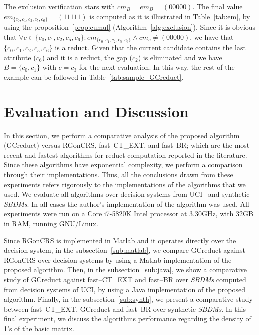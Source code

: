 \documentclass[number,preprint,review,12pt]{elsarticle}
\begin{document}
	The exclusion verification stars with $cm_B = em_B = (00000)$. The final value $em_{\lbrace c_0,c_1,c_2,c_5,c_6\rbrace}=(11111)$ is computed as it is illustrated in Table~\ref{tab:em}, by using the proposition~\ref{prop:cumul} (Algorithm~\ref{alg:exclusion}). Since it is obvious that $\forall c \in \lbrace c_0,c_1,c_2,c_5,c_6\rbrace : em_{\lbrace c_0,c_1,c_2,c_5,c_6\rbrace}\wedge cm_c \neq (00000)$, we have that $\lbrace c_0,c_1,c_2,c_5,c_6\rbrace$ is a reduct. Given that the current candidate contains the last attribute ($c_6$) and it is a reduct, the gap ($c_2$) is eliminated and we have $B = \lbrace c_0,c_1\rbrace$ with $c=c_3$ for the next evaluation. In this way, the rest of the example can be followed in Table~\ref{tab:sample_GCreduct}.

	
%
\section{Evaluation and Discussion}\label{evaluation}
	In this section, we perform a comparative analysis of the proposed algorithm (GCreduct) versus RGonCRS, fast--CT\_EXT, and fast--BR; which are the most recent and fastest algorithms for reduct computation reported in the literature. Since these algorithms have exponential complexity, we perform a comparison through their implementations. Thus, all the conclusions drawn from these experiments refers rigorously to the implementations of the algorithms that we used. We evaluate all algorithms over decision systems from UCI~\cite{Bache13} and synthetic \textit{SBDMs}. In all cases the author's implementation of the algorithm was used. All experiments were run on a Core i7-5820K Intel processor at 3.30GHz, with 32GB in RAM, running GNU/Linux.\label{par:implementation}
	
	Since RGonCRS is implemented in Matlab and it operates directly	over the decision system, in the subsection~\ref{sub:matlab}, we compare GCreduct against RGonCRS over decision systems by using a Matlab implementation of the proposed algorithm. Then, in the subsection~\ref{sub:java}, we show a comparative study of GCreduct against fast--CT\_EXT and fast--BR over \textit{SBDMs} computed from decision systems of UCI, by using a Java implementation of the proposed algorithm. Finally, in the subsection~\ref{sub:synth}, we present a comparative study between fast--CT\_EXT, GCreduct and fast--BR over synthetic \textit{SBDMs}. In this final experiment, we discuss the algorithms performance regarding the density of 1's of the basic matrix. 
	
\end{document}
